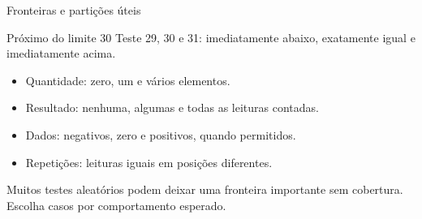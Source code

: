 \begin{frame}{Fronteiras e partições úteis}
\begin{block}{Próximo do limite 30}
Teste 29, 30 e 31: imediatamente abaixo, exatamente igual e imediatamente acima.
\end{block}
\begin{itemize}
\item Quantidade: zero, um e vários elementos.
\item Resultado: nenhuma, algumas e todas as leituras contadas.
\item Dados: negativos, zero e positivos, quando permitidos.
\item Repetições: leituras iguais em posições diferentes.
\end{itemize}
\small Muitos testes aleatórios podem deixar uma fronteira importante sem cobertura. Escolha casos por comportamento esperado.
\end{frame}
